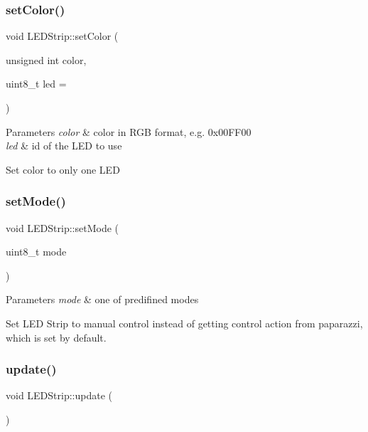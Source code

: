 \subsubsection{\texorpdfstring{set\+Color()}{setColor()}\hspace{0.1cm}{\footnotesize\ttfamily [2/2]}}
{\footnotesize\ttfamily void L\+E\+D\+Strip\+::set\+Color (\begin{DoxyParamCaption}\item[{unsigned int}]{color,  }\item[{uint8\+\_\+t}]{led = {} }\end{DoxyParamCaption})}


\begin{DoxyParams}{Parameters}
{\em color} & color in R\+GB format, e.\+g. 0x00\+F\+F00 \\
\hline
{\em led} & id of the L\+ED to use\\
\hline
\end{DoxyParams}
Set color to only one L\+ED \mbox{\label{class_l_e_d_strip_abf199367f3caaf9730262c4e7bef6bc1}} 
\subsubsection{\texorpdfstring{set\+Mode()}{setMode()}}
{\footnotesize\ttfamily void L\+E\+D\+Strip\+::set\+Mode (\begin{DoxyParamCaption}\item[{uint8\+\_\+t}]{mode }\end{DoxyParamCaption})}


\begin{DoxyParams}{Parameters}
{\em mode} & one of predifined modes\\
\hline
\end{DoxyParams}
Set L\+ED Strip to manual control instead of getting control action from paparazzi, which is set by default. \mbox{\label{class_l_e_d_strip_abc57d90870bb0e9c0d05e7ba6ca76c95}} 
\subsubsection{\texorpdfstring{update()}{update()}}
{\footnotesize\ttfamily void L\+E\+D\+Strip\+::update (\begin{DoxyParamCaption}{ }\end{DoxyParamCaption})\hspace{0.3cm}{\ttfamily [virtual]}}

